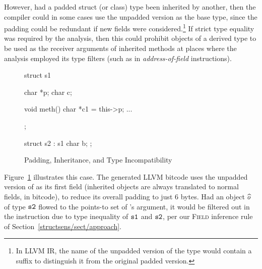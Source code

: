 However, had a padded struct (or class) type been inherited by
another, then the compiler could in some cases use the unpadded
version as the base type, since the padding could be redundant if new
fields were considered.\footnote{In LLVM IR, the name of the unpadded
  version of the type would contain a  suffix to
  distinguish it from the original padded version.} If strict type
equality was required by the analysis, then this could prohibit
objects of a derived type to be used as the receiver arguments of
inherited methods at places where the analysis employed its type
filters (such as in \emph{address-of-field} instructions).

\begin{figure}[h!t]
  \begin{minipage}[b]{.3\linewidth}
    \begin{lcppcode}
      struct s1 {
        char *p;
        char c;

        void meth() {
          char *c1 = this->p;
          ...
        }
      };

      struct s2 : s1 {
        char b;
      };
    \end{lcppcode}
    \label{structsens/fig/typeincompat:cxx}
  \end{minipage}%
  \qquad
  \begin{minipage}[b]{.6\linewidth}
    \centering\large
    \label{structsens/fig/typeincompat:bitcode}
  \end{minipage}
  \caption{Padding, Inheritance, and Type Incompatibility}
  \label{structsens/fig/typeincompat}
\end{figure}

Figure~\ref{structsens/fig/typeincompat} illustrates this case. The
generated LLVM bitcode uses the unpadded version of  as its
first field (inherited objects are always translated to normal fields,
in bitcode), to reduce its overall padding to just 6 bytes. Had an
object \(\widehat{o}\) of type \(\texttt{s2}\) flowed to the points-to set
of 's  argument, it would be filtered out
in the  instruction due to type inequality of
\(\texttt{s1}\) and \(\texttt{s2}\), per our \textsc{Field} inference rule
of Section~\ref{structsens/sect/approach}.

